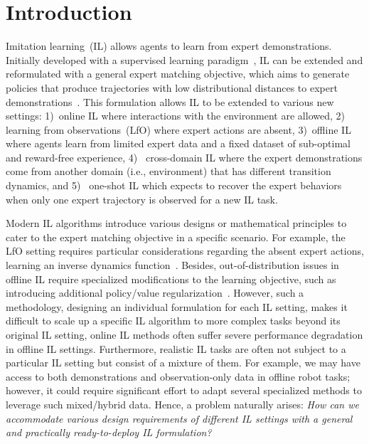 
\section{Introduction}
Imitation learning~(IL) allows agents to learn from expert demonstrations. 
Initially developed with a supervised learning paradigm~\citep{pomerleau1991efficient, schaal1996learning}, IL can be extended and reformulated with a general {expert matching objective}, which aims to generate policies that produce trajectories with low distributional distances to expert demonstrations~\citep{ho2016generative}.
%
This formulation allows IL to be extended to various new settings: 1)~online IL where interactions with the environment are allowed, 2)~{ learning from observations~(LfO)} where expert actions are absent, 3)~{offline IL where agents learn from limited expert data and a fixed dataset of {sub-optimal and reward-free} experience}, 4)~{ cross-domain IL} where the expert demonstrations come from another domain (i.e., environment) that has different transition dynamics, and 5)~ one-shot IL which expects to recover the expert behaviors when only one expert trajectory is observed for a new IL task.


Modern IL algorithms introduce various designs or mathematical principles to cater to the expert matching objective in a specific scenario. 
%
For example, the LfO setting requires particular considerations regarding the absent expert actions, \eg learning an inverse dynamics function~\citep{baker2022video, torabi2018behavioral}.
%
Besides, out-of-distribution issues in offline IL require specialized modifications to the learning objective, such as introducing additional policy/value regularization~\citep{jarboui2021offline, yue2023clare}.  
%
However, such a methodology, designing an individual formulation for each IL setting, makes it difficult to scale up a specific IL algorithm to more complex tasks beyond its original IL setting, \eg online IL methods often suffer severe performance degradation in offline IL settings. 
Furthermore, realistic IL tasks are often not subject to a particular IL setting but consist of a mixture of them. For example, we may have access to both demonstrations and observation-only data in offline robot tasks; however, it could require significant effort to adapt several specialized methods to leverage such mixed/hybrid data. Hence, a problem naturally arises: \textit{How can we accommodate various design requirements of different IL settings with a general and practically ready-to-deploy IL formulation?} 

